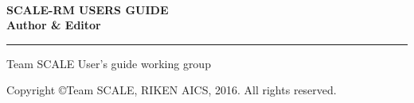 \newpage
\thispagestyle{empty}

　\\

\vspace{10mm}
{\large{\bf SCALE-RM USERS GUIDE}}\\


\vspace{10mm}
{\large{\bf Author \& Editor}}\\
\hrule width 90mm
\begin{tabbing} 
Team SCALE User's guide working group\\
\end{tabbing} 


\vspace{110mm}
\begin{flushright}

\vspace{10mm}
Copyright \copyright Team SCALE, RIKEN AICS, 2016. All rights reserved.
\end{flushright}


